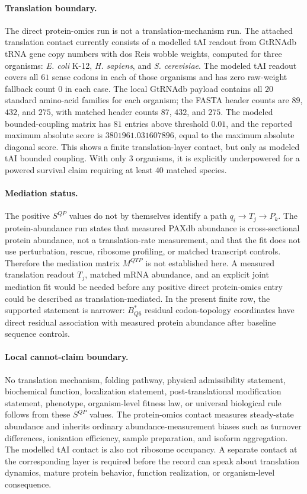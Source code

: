 \paragraph{Translation boundary.}
The direct protein-omics run is not a translation-mechanism run.  The attached translation contact currently consists of a modelled tAI readout from GtRNAdb tRNA gene copy numbers with dos Reis wobble weights, computed for three organisms: \textit{E. coli} K-12, \textit{H. sapiens}, and \textit{S. cerevisiae}.  The modeled tAI readout covers all $61$ sense codons in each of those organisms and has zero raw-weight fallback count $0$ in each case.  The local GtRNAdb payload contains all $20$ standard amino-acid families for each organism; the FASTA header counts are $89$, $432$, and $275$, with matched header counts $87$, $432$, and $275$.  The modeled bounded-coupling matrix has $81$ entries above threshold $0.01$, and the reported maximum absolute score is $3801961.031607896$, equal to the maximum absolute diagonal score.  This shows a finite translation-layer contact, but only as modeled tAI bounded coupling.  With only $3$ organisms, it is explicitly underpowered for a powered survival claim requiring at least $40$ matched species.

\paragraph{Mediation status.}
The positive $S^{QP}$ values do not by themselves identify a path $q_i \to T_j \to P_k$.  The protein-abundance run states that measured PAXdb abundance is cross-sectional protein abundance, not a translation-rate measurement, and that the fit does not use perturbation, rescue, ribosome profiling, or matched transcript controls.  Therefore the mediation matrix $M^{QTP}$ is not established here.  A measured translation readout $T_j$, matched mRNA abundance, and an explicit joint mediation fit would be needed before any positive direct protein-omics entry could be described as translation-mediated.  In the present finite row, the supported statement is narrower: $B^{*}_{Q6}$ residual codon-topology coordinates have direct residual association with measured protein abundance after baseline sequence controls.

\paragraph{Local cannot-claim boundary.}
No translation mechanism, folding pathway, physical admissibility statement, biochemical function, localization statement, post-translational modification statement, phenotype, organism-level fitness law, or universal biological rule follows from these $S^{QP}$ values.  The protein-omics contact measures steady-state abundance and inherits ordinary abundance-measurement biases such as turnover differences, ionization efficiency, sample preparation, and isoform aggregation.  The modelled tAI contact is also not ribosome occupancy.  A separate contact at the corresponding layer is required before the record can speak about translation dynamics, mature protein behavior, function realization, or organism-level consequence.

